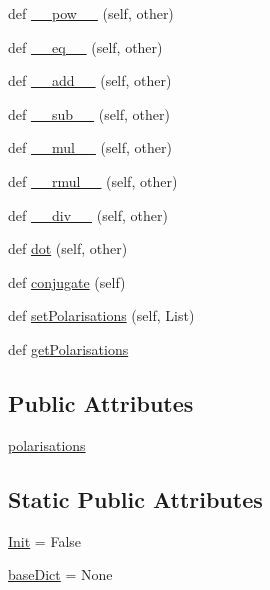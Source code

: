\begin{DoxyCompactItemize}
def \hyperlink{class_py_spinor_1_1pol_dictionary_1_1pol_dictionary_a94a6ab60c306097e4df90cf20ff68049}{\+\_\+\+\_\+pow\+\_\+\+\_\+} (self, other)
\item 
def \hyperlink{class_py_spinor_1_1pol_dictionary_1_1pol_dictionary_ae0daee8a58d2276a21361b485d116d16}{\+\_\+\+\_\+eq\+\_\+\+\_\+} (self, other)
\item 
def \hyperlink{class_py_spinor_1_1pol_dictionary_1_1pol_dictionary_ac768f267649ef1eb18069e05b01523bf}{\+\_\+\+\_\+add\+\_\+\+\_\+} (self, other)
\item 
def \hyperlink{class_py_spinor_1_1pol_dictionary_1_1pol_dictionary_ae28a8853b036efc88bdf3088fe1a319f}{\+\_\+\+\_\+sub\+\_\+\+\_\+} (self, other)
\item 
def \hyperlink{class_py_spinor_1_1pol_dictionary_1_1pol_dictionary_a9bfd6a64b42a35c3c9c048a1fa6340fd}{\+\_\+\+\_\+mul\+\_\+\+\_\+} (self, other)
\item 
def \hyperlink{class_py_spinor_1_1pol_dictionary_1_1pol_dictionary_a678e776af32f540e70b5d2731885580b}{\+\_\+\+\_\+rmul\+\_\+\+\_\+} (self, other)
\item 
def \hyperlink{class_py_spinor_1_1pol_dictionary_1_1pol_dictionary_ac36e04fe18bd3b018360c2520cbf9476}{\+\_\+\+\_\+div\+\_\+\+\_\+} (self, other)
\item 
def \hyperlink{class_py_spinor_1_1pol_dictionary_1_1pol_dictionary_a727a579d4b80d6e9086d6972be9481d2}{dot} (self, other)
\item 
def \hyperlink{class_py_spinor_1_1pol_dictionary_1_1pol_dictionary_acca12ba92e7d4582d580f9d49afddc0d}{conjugate} (self)
\item 
def \hyperlink{class_py_spinor_1_1pol_dictionary_1_1pol_dictionary_a18adf99ec4125f4bca8b6435ac893c75}{set\+Polarisations} (self, List)
\item 
def \hyperlink{class_py_spinor_1_1pol_dictionary_1_1pol_dictionary_ad6894204400171c538f4b1266acfed28}{get\+Polarisations}
\end{DoxyCompactItemize}
\subsection*{Public Attributes}
\begin{DoxyCompactItemize}
\item 
\hyperlink{class_py_spinor_1_1pol_dictionary_1_1pol_dictionary_a4af4ee4e42c9fc945e688e94afc69222}{polarisations}
\end{DoxyCompactItemize}
\subsection*{Static Public Attributes}
\begin{DoxyCompactItemize}
\item 
\hyperlink{class_py_spinor_1_1pol_dictionary_1_1pol_dictionary_aa8533ad7b225385b3d7463ff598a594a}{Init} = False
\item 
\hyperlink{class_py_spinor_1_1pol_dictionary_1_1pol_dictionary_a2997e213a191212d4e76e02fe2c79440}{base\+Dict} = None
\end{DoxyCompactItemize}


